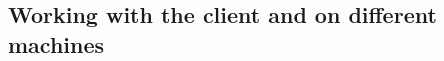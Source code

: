 


\subsection{\gdclient}


\subsection{\gdserver}
 

\subsection{Working with the client and \gdserver on different machines}



